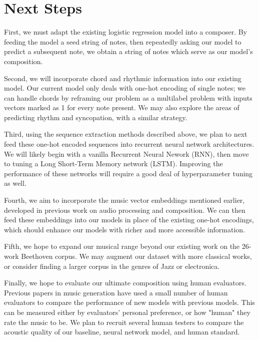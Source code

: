 \documentclass[twoside,twocolumn]{article}
\begin{document}

\section{Next Steps}

First, we must adapt the existing logistic regression model into a composer. By feeding the model a seed string of notes, then repeatedly asking our model to predict a subsequent note, we obtain a string of notes which serve as our model's composition.

Second, we will incorporate chord and rhythmic information into our existing model. Our current model only deals with one-hot encoding of single notes; we can handle chords by reframing our problem as a multilabel problem with inputs vectors marked as 1 for every note present. We may also explore the areas of predicting rhythm and syncopation, with a similar strategy.

Third, using the sequence extraction methods described above, we plan to next feed these one-hot encoded sequences into recurrent neural network architectures. We will likely begin with a vanilla Recurrent Neural Nework (RNN), then move to tuning a Long Short-Term Memory network (LSTM). Improving the performance of these networks will require a good deal of hyperparameter tuning as well.

Fourth, we aim to incorporate the music vector embeddings mentioned earlier, developed in previous work on audio processing and composition. We can then feed these embeddings into our models in place of the existing one-hot encodings, which should enhance our models with richer and more accessible information.

Fifth, we hope to expand our musical range beyond our existing work on the 26-work Beethoven corpus. We may augment our dataset with more classical works, or consider finding a larger corpus in the genres of Jazz or electronica.

Finally, we hope to evaluate our ultimate composition using human evaluators. Previous papers in music generation have used a small number of human evaluators to compare the performance of new models with previous models. This can be measured either by evaluators' personal preference, or how "human" they rate the music to be. We plan to recruit several human testers to compare the acoustic quality of our baseline, neural network model, and human standard.


\end{document}
